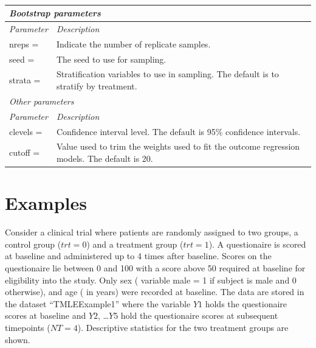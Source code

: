 \documentclass[10pt]{article}
\begin{document}
{\ \ \hspace{0.0in}}
\begin{minipage}[t]{6.2in}
\begin{flushleft}
\small
\renewcommand{\arraystretch}{1.2}
\begin{spacing}{1.1}
\begin{tabular}[l]{|p{1.3in}|p{4.6in}|}
   \multicolumn{2}{l}{\normalsize\em Bootstrap parameters \rule[0.0in]{0.0in}{0.3in}} \\\hline
   {\normalsize\em\em Parameter }& 
   {\normalsize\em\em Description}
\\\hline
   nreps =           &  Indicate the number of replicate samples.
\\\hline
   seed =            &  The seed to use for sampling.  
\\\hline
   strata =          &  Stratification variables to use in sampling. The default is to stratify by treatment.   
\\\hline
   \multicolumn{2}{l}{\normalsize\em Other parameters \rule[0.0in]{0.0in}{0.3in}} \\\hline
   {\normalsize\em\em Parameter }& 
   {\normalsize\em\em Description}
\\\hline
   clevels =         &  Confidence interval level.  The default is 95\% confidence intervals.
\\\hline
   cutoff =          &  Value used to trim the weights used to fit the outcome regression models.  The default is 20.
\\\hline
\end{tabular}
\end{spacing}
\end{flushleft}
\end{minipage}

\vspace{0.1in}
\newpage

\section*{Examples}
Consider a clinical trial where patients are randomly assigned to two groups, a control group ($trt = 0$) and a treatment group ($trt = 1$).  A questionaire is scored at baseline and administered up to 4 times after baseline.  Scores on the questionaire lie between 0 and 100 with a score above 50 required at baseline for eligibility into the study.  Only sex ( variable male = 1 if subject is male and 0 otherwise), and age ( in years) were recorded at baseline.  The data are stored in the dataset ``TMLEExample1'' where the variable $Y1$ holds the questionaire scores at baseline and $Y2$, \ldots $Y5$ hold the questionaire scores at subsequent timepoints ($NT = 4$).  Descriptive statistics for the two treatment groups are shown.
\vspace{-0.05in}
\end{document}
